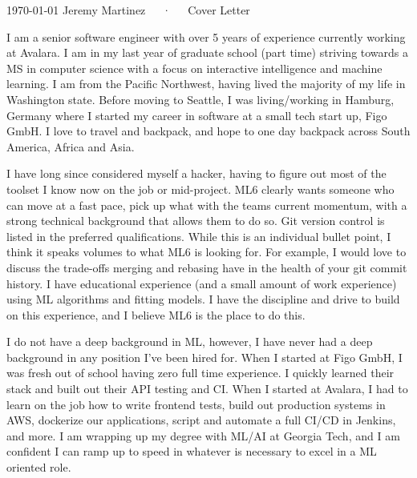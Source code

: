 \documentclass[11pt, a4paper]{awesome-cv}
\begin{document}
\makecvheader[R]

\makecvfooter
  {\today}
  {Jeremy Martinez~~~·~~~Cover Letter}
  {}

\makelettertitle

\begin{cvletter}

I am a senior software engineer with over 5 years of experience currently working at Avalara. I am in my last year of graduate school (part time) striving towards a MS in computer science with a focus on interactive intelligence and machine learning. I am from the Pacific Northwest, having lived the majority of my life in Washington state. Before moving to Seattle, I was living/working in Hamburg, Germany where I started my career in software at a small tech start up, Figo GmbH. I love to travel and backpack, and hope to one day backpack across South America, Africa and Asia.

I have long since considered myself a hacker, having to figure out most of the toolset I know now on the job or mid-project. ML6 clearly wants someone who can move at a fast pace, pick up what with the teams current momentum, with a strong technical background that allows them to do so. Git version control is listed in the preferred qualifications. While this is an individual bullet point, I think it speaks volumes to what ML6 is looking for. For example, I would love to discuss the trade-offs merging and rebasing have in the health of your git commit history. I have educational experience (and a small amount of work experience) using ML algorithms and fitting models. I have the discipline and drive to build on this experience, and I believe ML6 is the place to do this.

I do not have a deep background in ML, however, I have never had a deep background in any position I've been hired for. When I started at Figo GmbH, I was fresh out of school having zero full time experience. I quickly learned their stack and built out their API testing and CI. When I started at Avalara, I had to learn on the job how to write frontend tests, build out production systems in AWS, dockerize our applications, script and automate a full CI/CD in Jenkins, and more. I am wrapping up my degree with ML/AI at Georgia Tech, and I am confident I can ramp up to speed in whatever is necessary to excel in a ML oriented role.


\end{cvletter}
\end{document}
